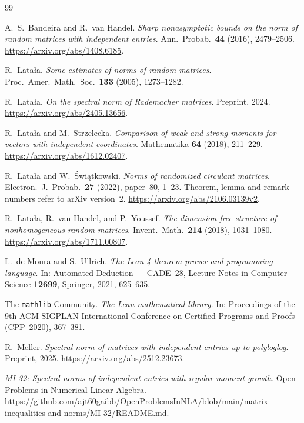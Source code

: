 \documentclass[11pt]{article}
\theoremstyle{definition}
\theoremstyle{remark}
\begin{document}
\begin{thebibliography}{99}\raggedright

A.~S.~Bandeira and R.~van Handel.
\emph{Sharp nonasymptotic bounds on the norm of random matrices with
independent entries}. Ann.\ Probab.\ \textbf{44} (2016), 2479--2506.
\url{https://arxiv.org/abs/1408.6185}.

R.~Lata\l a.
\emph{Some estimates of norms of random matrices}.
Proc.\ Amer.\ Math.\ Soc.\ \textbf{133} (2005), 1273--1282.

R.~Lata\l a.
\emph{On the spectral norm of Rademacher matrices}.
Preprint, 2024. \url{https://arxiv.org/abs/2405.13656}.

R.~Lata\l a and M.~Strzelecka.
\emph{Comparison of weak and strong moments for vectors with independent
coordinates}. Mathematika \textbf{64} (2018), 211--229.
\url{https://arxiv.org/abs/1612.02407}.

R.~Lata\l a and W.~\'Swi\k{a}tkowski.
\emph{Norms of randomized circulant matrices}.
Electron.\ J.\ Probab.\ \textbf{27} (2022), paper~80, 1--23.
Theorem, lemma and remark numbers refer to arXiv version~2.
\url{https://arxiv.org/abs/2106.03139v2}.

R.~Lata\l a, R.~van Handel, and P.~Youssef.
\emph{The dimension-free structure of nonhomogeneous random matrices}.
Invent.\ Math.\ \textbf{214} (2018), 1031--1080.
\url{https://arxiv.org/abs/1711.00807}.

L.~de Moura and S.~Ullrich.
\emph{The Lean 4 theorem prover and programming language}.
In: Automated Deduction --- CADE~28, Lecture Notes in Computer Science
\textbf{12699}, Springer, 2021, 625--635.

The \texttt{mathlib} Community.
\emph{The Lean mathematical library}.
In: Proceedings of the 9th ACM SIGPLAN International Conference on
Certified Programs and Proofs (CPP~2020), 367--381.

R.~Meller.
\emph{Spectral norm of matrices with independent entries up to
polyloglog}. Preprint, 2025.
\url{https://arxiv.org/abs/2512.23673}.

\emph{MI-32: Spectral norms of independent entries with regular moment
growth}. Open Problems in Numerical Linear Algebra.
\url{https://github.com/ajt60gaibb/OpenProblemsInNLA/blob/main/matrix-inequalities-and-norms/MI-32/README.md}.


\end{thebibliography}
\end{document}

